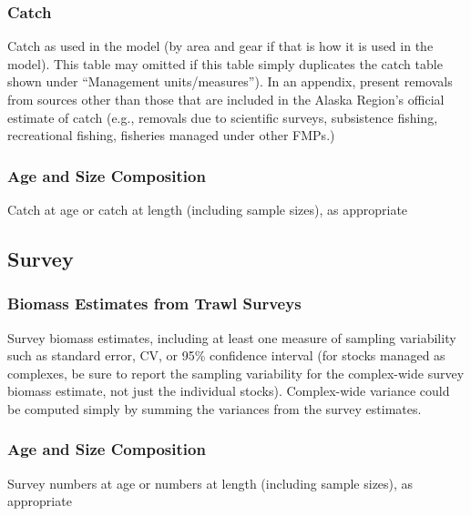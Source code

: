 \documentclass[
  11pt,
]{article}
\begin{document}
\hypertarget{catch}{%
\subsubsection{Catch}\label{catch}}

Catch as used in the model (by area and gear if that is how it is used in the model).
This table may omitted if this table simply duplicates the catch table shown under ``Management units/measures'').
In an appendix, present removals from sources other than those that are included in the Alaska Region's official estimate of catch (e.g., removals due to scientific surveys, subsistence fishing, recreational fishing, fisheries managed under other FMPs.)

\hypertarget{age-and-size-composition}{%
\subsubsection{Age and Size Composition}\label{age-and-size-composition}}

Catch at age or catch at length (including sample sizes), as appropriate

\hypertarget{survey}{%
\subsection{Survey}\label{survey}}

\hypertarget{biomass-estimates-from-trawl-surveys}{%
\subsubsection{Biomass Estimates from Trawl Surveys}\label{biomass-estimates-from-trawl-surveys}}

Survey biomass estimates, including at least one measure of sampling variability such as standard error, CV, or 95\% confidence interval (for stocks managed as complexes, be sure to report the sampling variability for the complex-wide survey biomass estimate, not just the individual stocks).
Complex-wide variance could be computed simply by summing the variances from the survey estimates.

\hypertarget{age-and-size-composition-1}{%
\subsubsection{Age and Size Composition}\label{age-and-size-composition-1}}

Survey numbers at age or numbers at length (including sample sizes), as appropriate
\end{document}
